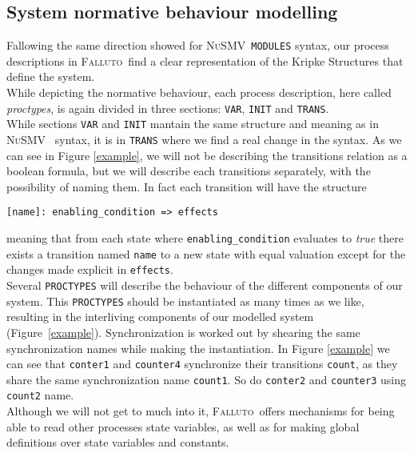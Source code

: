 \documentclass{llncs2e/llncs}
\newcommand{\nusmv}{\mbox{\textsc{NuSMV}}}
\newcommand{\fallutoSp}{\nohyphens{\textsc{Falluto~}}}  %
\newcommand{\textfll}[1]{\texttt{#1}}                   %
\begin{document}
\subsection{System normative behaviour modelling}
Fallowing the same direction showed for \nusmv~\texttt{MODULES} syntax, our process descriptions in \fallutoSp find a clear representation of the Kripke Structures that define the system.\\
While depicting the normative behaviour, each process description, here called \textit{proctypes}, is again divided in three sections: \texttt{VAR}, \texttt{INIT} and \texttt{TRANS}.\\
While sections \texttt{VAR} and \texttt{INIT} mantain the same structure and meaning as in \nusmv~ syntax, it is in \texttt{TRANS} where we find a real change in the syntax. As we can see in Figure \ref{example}, we will not be describing the transitions relation as a boolean formula, but we will describe each transitions separately, with the possibility of naming them. In fact each transition will have the structure
\begin{center}
\textfll{[name]: enabling\_condition => effects}
\end{center}
meaning that from each state where \texttt{enabling\_condition} evaluates to \textit{true} there exists a transition named \texttt{name} to a new state with equal valuation except for the changes made explicit in \texttt{effects}.\\
Several \texttt{PROCTYPES} will describe the behaviour of the different components of our system. This \texttt{PROCTYPES} should be instantiated as many times as we like, resulting in the interliving components of our modelled system (\mbox{Figure \ref{example}}).
Synchronization is worked out by shearing the same synchronization names while making the instantiation. In Figure \ref{example} we can see that \texttt{conter1} and \texttt{counter4} synchronize their transitions \texttt{count}, as they share the same synchronization name \texttt{count1}. So do \texttt{conter2} and \texttt{counter3} using \texttt{count2} name.\\
Although we will not get to much into it, \fallutoSp offers mechanisms for being able to read other processes state variables, as well as for making global definitions over state variables and constants.
\end{document}

